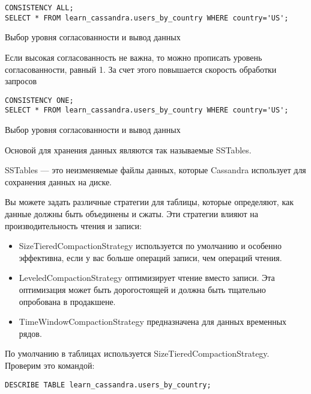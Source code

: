 \begin{verbatim}
CONSISTENCY ALL;
SELECT * FROM learn_cassandra.users_by_country WHERE country='US';
\end{verbatim}

\begin{image}
	\caption{Выбор уровня согласованности и вывод данных}
	\label{fig:consistency:all}
\end{image}

Если высокая согласованность не важна, то можно прописать уровень
согласованности, равный 1.
За счет этого повышается скорость обработки запросов

\begin{verbatim}
CONSISTENCY ONE;
SELECT * FROM learn_cassandra.users_by_country WHERE country='US';
\end{verbatim}

\begin{image}
	\caption{Выбор уровня согласованности и вывод данных}
	\label{fig:consistency:one}
\end{image}

Основой для хранения данных являются так называемые SSTables.\par
SSTables --- это неизменяемые файлы данных, которые Cassandra использует для
сохранения данных на диске.\par
Вы можете задать различные стратегии для таблицы, которые определяют,
как данные должны быть объединены и сжаты. Эти стратегии влияют на
производительность чтения и записи:

\begin{itemize}
	\item SizeTieredCompactionStrategy используется по умолчанию и особенно
		эффективна, если у вас больше операций записи, чем операций чтения.
	\item LeveledCompactionStrategy оптимизирует чтение вместо записи. Эта
		оптимизация может быть дорогостоящей
		и должна быть тщательно опробована в продакшене.
	\item TimeWindowCompactionStrategy предназначена для данных временных
		рядов.
\end{itemize}

По умолчанию в таблицах используется SizeTieredCompactionStrategy.
Проверим это командой:

\begin{verbatim}
DESCRIBE TABLE learn_cassandra.users_by_country;
\end{verbatim}

